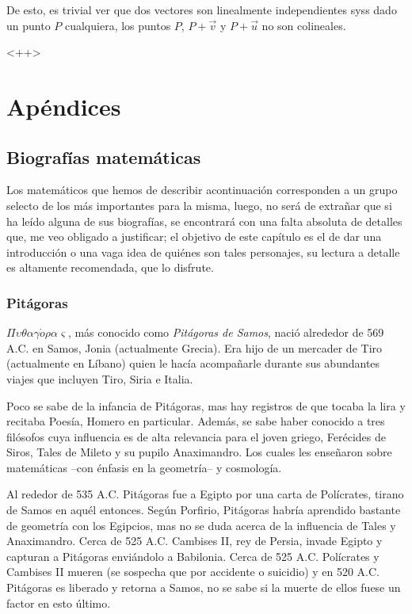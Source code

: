 \documentclass[11pt,a4paper]{book}
\begin{document}
De esto, es trivial ver que dos vectores son linealmente independientes syss dado un punto $P$ cualquiera, los puntos $P$, $P+\vec v$ y $P+\vec u$ no son colineales.
\begin{thm}

\end{thm}
<++>

\part*{Apéndices}
\appendix
\chapter{Biografías matemáticas}
Los matemáticos que hemos de describir acontinuación corresponden a un grupo selecto de los más importantes para la misma, luego, no será de extrañar que si ha leído alguna de sus biografías, se encontrará con una falta absoluta de detalles que, me veo obligado a justificar; el objetivo de este capítulo es el de dar una introducción o una vaga idea de quiénes son tales personajes, su lectura a detalle es altamente recomendada, que lo disfrute.

\section{Pitágoras}
$\Pi\upsilon\theta\alpha\gamma\acute{o}\rho\alpha\varsigma$, más conocido como \textit{Pitágoras de Samos}, nació alrededor de 569 A.C. en Samos, Jonia (actualmente Grecia). Era hijo de un mercader de Tiro (actualmente en Líbano) quien le hacía acompañarle durante sus abundantes viajes que incluyen Tiro, Siria e Italia.

Poco se sabe de la infancia de Pitágoras, mas hay registros de que tocaba la lira y recitaba Poesía, Homero en particular. Además, se sabe haber conocido a tres filósofos cuya influencia es de alta relevancia para el joven griego, Ferécides de Siros, Tales de Mileto y su pupilo Anaximandro. Los cuales les enseñaron sobre matemáticas --con énfasis en la geometría-- y cosmología.

Al rededor de 535 A.C. Pitágoras fue a Egipto por una carta de Polícrates, tirano de Samos en aquél entonces. Según Porfirio, Pitágoras habría aprendido bastante de geometría con los Egipcios, mas no se duda acerca de la influencia de Tales y Anaximandro. Cerca de 525 A.C. Cambises II, rey de Persia, invade Egipto y capturan a Pitágoras enviándolo a Babilonia. Cerca de 525 A.C. Polícrates y Cambises II mueren (se sospecha que por accidente o suicidio) y en 520 A.C. Pitágoras es liberado y retorna a Samos, no se sabe si la muerte de ellos fuese un factor en esto último.
\end{document}
